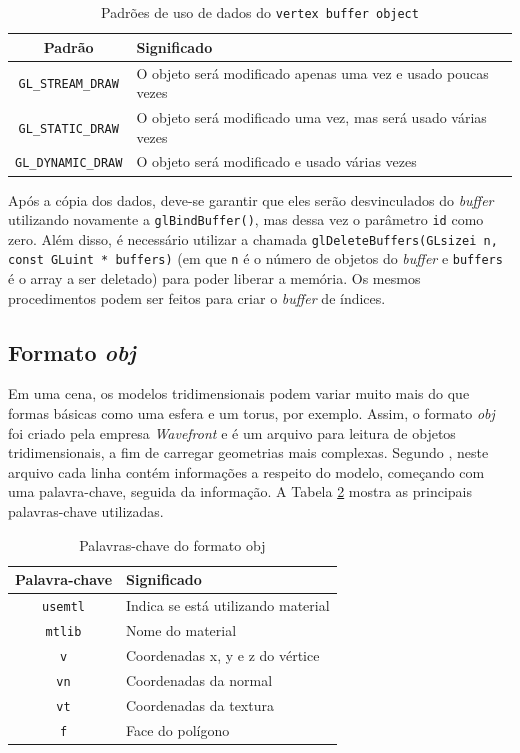 \begin{table}[h]
	\centering	
	\begin{tabularx}{0.9\textwidth}{cX}
		\toprule
		\textbf{Padrão} & \textbf{Significado}  \\
		\midrule
		\texttt{GL\_STREAM\_DRAW} &  O objeto será modificado apenas uma vez e usado poucas vezes  \\
		\texttt{GL\_STATIC\_DRAW} & O objeto será modificado uma vez, mas será usado várias vezes \\
		\texttt{GL\_DYNAMIC\_DRAW} &  O objeto será modificado e usado várias vezes \\
		\bottomrule
	\end{tabularx}
	\caption{ Padrões de uso de dados do \texttt{vertex buffer object}}
	\label{bd}
\end{table}

	Após a cópia dos dados, deve-se garantir que eles serão desvinculados do \textit{buffer} utilizando novamente a \texttt{glBindBuffer()}, mas dessa vez o parâmetro \texttt{id} como zero. Além disso, é necessário utilizar a chamada \texttt{glDeleteBuffers(GLsizei n, const GLuint * buffers)} (em que  \texttt{n} é o número de objetos do \textit{buffer} e \texttt{buffers} é o array a ser deletado) para poder liberar a memória. Os mesmos procedimentos podem ser feitos para criar o \textit{buffer} de índices. 
  

\subsection{Formato \textit{obj}}
\label{formatobj}

	Em uma cena, os modelos tridimensionais podem variar muito mais do que formas básicas como uma esfera e um torus, por exemplo. Assim, o formato \textit{obj} foi criado pela empresa  \textit{Wavefront} e é um arquivo para leitura de objetos tridimensionais, a fim de carregar geometrias mais complexas. Segundo \cite{graphicsprog}, neste arquivo cada linha contém informações a respeito do modelo, começando com uma palavra-chave, seguida da informação. A  Tabela \ref{palavraschave} mostra as principais palavras-chave utilizadas. 

\begin{table}[h]
	\centering	
	\begin{tabular}{cl}
		\toprule
		\textbf{Palavra-chave} & \textbf{Significado}  \\
		\midrule
		\texttt{usemtl} & Indica se está utilizando material  \\
		\texttt{mtlib} &  Nome do material \\
		\texttt{v} &  Coordenadas x, y e z do vértice \\
		\texttt{vn} & Coordenadas da normal \\
		\texttt{vt} &  Coordenadas da textura \\
		\texttt{f} &  Face do polígono \\
		\bottomrule
	\end{tabular}
	\caption{ Palavras-chave do formato obj}
	\label{palavraschave}
\end{table}

